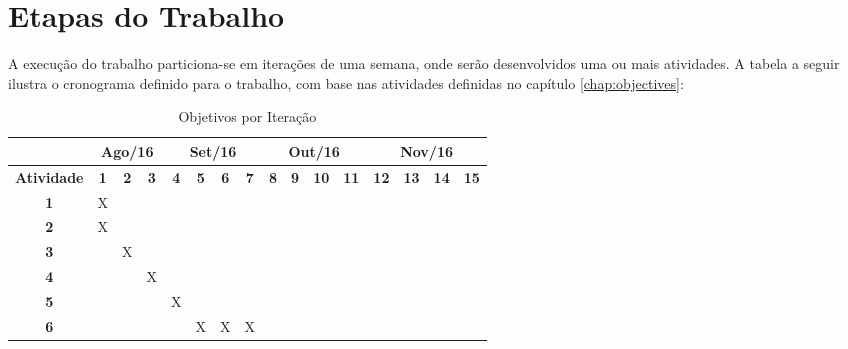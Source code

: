 \chapter{\label{chap:work-plan}Etapas do Trabalho}

A execução do trabalho particiona-se em iterações de uma semana, onde serão
desenvolvidos uma ou mais atividades. A tabela a seguir ilustra o cronograma
definido para o trabalho, com base nas atividades definidas no capítulo
\ref{chap:objectives}:

\begin{table}[htb!]
\centering
\caption{Objetivos por Iteração}
\label{tab:work-plan}
\begin{tabular}{c|c|c|c|c|c|c|c|c|c|c|c|c|c|c|c|}
\cline{2-16}
{\bf}                                 & \multicolumn{3}{c|}{{\bf Ago/16}} & \multicolumn{4}{c|}{{\bf Set/16}}     & \multicolumn{4}{c|}{{\bf Out/16}}      & \multicolumn{4}{c|}{{\bf Nov/16}}     \\ \hline
\multicolumn{1}{|c|}{{\bf Atividade}} & {\bf 1} & {\bf 2} & {\bf 3}	      & {\bf 4} & {\bf 5} & {\bf 6} & {\bf 7} & {\bf 8} & {\bf 9} & {\bf 10} & \bf{11} & \bf{12} & \bf{13} & \bf{14} & \bf{15} \\ \hline
\multicolumn{1}{|c|}{{\bf 1}}         & X       &         &               &         &         &         &         &         &         &          &         &         &         &         &         \\ \hline
\multicolumn{1}{|c|}{{\bf 2}}         & X       &         &               &         &         &         &         &         &         &          &         &         &         &         &         \\ \hline
\multicolumn{1}{|c|}{{\bf 3}}         &         & X       &               &         &         &         &         &         &         &          &         &         &         &         &         \\ \hline
\multicolumn{1}{|c|}{{\bf 4}}         &         &         & X             &         &         &         &         &         &         &          &         &         &         &         &         \\ \hline
\multicolumn{1}{|c|}{{\bf 5}}         &         &         &               & X       &         &         &         &         &         &          &         &         &         &         &         \\ \hline
\multicolumn{1}{|c|}{{\bf 6}}         &         &         &               &         & X       & X       & X       &         &         &          &         &         &         &         &         \\ \hline

\end{tabular}
\end{table}
